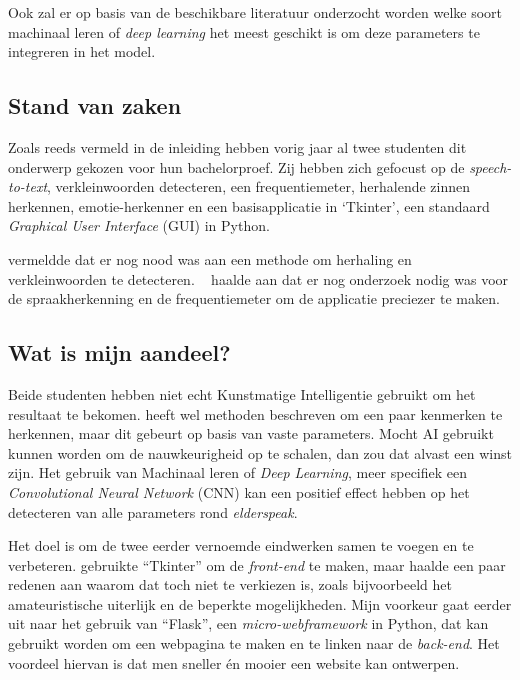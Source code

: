 Ook zal er op basis van de beschikbare literatuur onderzocht worden welke soort machinaal leren of \textit{deep learning} het meest geschikt is om deze parameters te integreren in het model.

\subsection{Stand van zaken}\label{subsec:stand-van-zaken}

Zoals reeds vermeld in de inleiding hebben vorig jaar al twee studenten dit onderwerp gekozen voor hun bachelorproef.
Zij hebben zich gefocust op de \textit{speech-to-text}, verkleinwoorden detecteren, een frequentiemeter, herhalende zinnen herkennen, emotie-herkenner en een basisapplicatie in `Tkinter', een standaard \textit{Graphical User Interface} (GUI) in Python.

\textcite{Beeckman2021} vermeldde dat er nog nood was aan een methode om herhaling en verkleinwoorden te detecteren. ~\textcite{Standaert2021} haalde aan dat er nog onderzoek nodig was voor de spraakherkenning en de frequentiemeter om de applicatie preciezer te maken.

\subsection{Wat is mijn aandeel?}\label{subsec:watismijnadeel}

Beide studenten hebben niet echt Kunstmatige Intelligentie gebruikt om het resultaat te bekomen. \textcite{Standaert2021} heeft wel methoden beschreven om een paar kenmerken te herkennen, maar dit gebeurt op basis van vaste parameters.
Mocht AI gebruikt kunnen worden om de nauwkeurigheid op te schalen, dan zou dat alvast een winst zijn.
Het gebruik van Machinaal leren of \textit{Deep Learning}, meer specifiek een \textit{Convolutional Neural Network} (CNN) kan een positief effect hebben op het detecteren van alle parameters rond \textit{elderspeak}.

Het doel is om de twee eerder vernoemde eindwerken samen te voegen en te verbeteren. \textcite{Beeckman2021} gebruikte ``Tkinter'' om de \textit{front-end} te maken, maar haalde een paar redenen aan waarom dat toch niet te verkiezen is, zoals bijvoorbeeld het amateuristische uiterlijk en de beperkte mogelijkheden.
Mijn voorkeur gaat eerder uit naar het gebruik van ``Flask'', een \textit{micro-webframework} in Python, dat kan gebruikt worden om een webpagina te maken en te linken naar de \textit{back-end}.
Het voordeel hiervan is dat men sneller én mooier een website kan ontwerpen.


